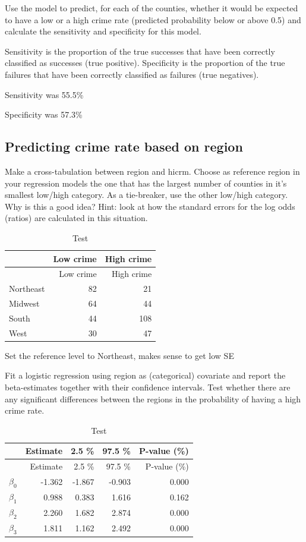 \documentclass[a4paper]{article}
\begin{document}
Use the model to predict, for each of the counties, whether it would be
expected to have a low or a high crime rate (predicted probability below
or above 0.5) and calculate the sensitivity and specificity for this
model.

Sensitivity is the proportion of the true successes that have been
correctly classified as successes (true positive). Specificity is the
proportion of the true failures that have been correctly classified as
failures (true negatives).

Sensitivity was 55.5\%

Specificity was 57.3\%

\subsection{Predicting crime rate based on
region}\label{predicting-crime-rate-based-on-region}

Make a cross-tabulation between region and hicrm. Choose as reference
region in your regression models the one that has the largest number of
counties in it's smallest low/high category. As a tie-breaker, use the
other low/high category. Why is this a good idea? Hint: look at how the
standard errors for the log odds (ratios) are calculated in this
situation.

\begin{longtable}[]{@{}lrr@{}}
\caption{Test}\tabularnewline
\toprule
& Low crime & High crime\tabularnewline
\midrule
\endfirsthead
\toprule
& Low crime & High crime\tabularnewline
\midrule
\endhead
Northeast & 82 & 21\tabularnewline
Midwest & 64 & 44\tabularnewline
South & 44 & 108\tabularnewline
West & 30 & 47\tabularnewline
\bottomrule
\end{longtable}

Set the reference level to Northeast, makes sense to get low SE

Fit a logistic regression using region as (categorical) covariate and
report the beta-estimates together with their confidence intervals. Test
whether there are any significant differences between the regions in the
probability of having a high crime rate.

\begin{longtable}[]{@{}lrrrr@{}}
\caption{Test}\tabularnewline
\toprule
& Estimate & 2.5 \% & 97.5 \% & P-value (\%)\tabularnewline
\midrule
\endfirsthead
\toprule
& Estimate & 2.5 \% & 97.5 \% & P-value (\%)\tabularnewline
\midrule
\endhead
\(\beta_0\) & -1.362 & -1.867 & -0.903 & 0.000\tabularnewline
\(\beta_1\) & 0.988 & 0.383 & 1.616 & 0.162\tabularnewline
\(\beta_2\) & 2.260 & 1.682 & 2.874 & 0.000\tabularnewline
\(\beta_3\) & 1.811 & 1.162 & 2.492 & 0.000\tabularnewline
\bottomrule
\end{longtable}
\end{document}
